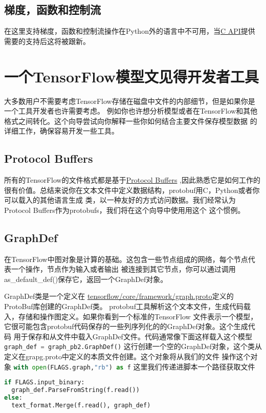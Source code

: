 \subsection{梯度，函数和控制流}
在这里支持梯度，函数和控制流操作在Python外的语言中不可用，当\href{https://www.github.com/tensorflow/tensorflow/blob/r1.4/tensorflow/c/c_api.h}{C API}提供需要的支持后这将被跟新。
\section{一个TensorFlow模型文见得开发者工具}
大多数用户不需要考虑TensorFlow存储在磁盘中文件的内部细节，但是如果你是一个工具开发者也许需要考虑。
例如你也许想分析模型或者在TensorFlow和其他格式之间转化。这个向导尝试向你解释一些你如何结合主要文件保存模型数据
的详细工作，确保容易开发一些工具。
\subsection{Protocol Buffers}
所有的TensorFlow的文件格式都是基于\href{https://developers.google.com/protocol-buffers/?hl=en}{Protocol Buffers}
,因此熟悉它是如何工作的很有价值。总结来说你在文本文件中定义数据结构，protobuf用C，Python或者你可以载入的其他语言生成
类，以一种友好的方式访问数据。我们经常认为Protocol Buffers作为protobufs，我们将在这个向导中使用用这个
这个惯例。
\subsection{GraphDef}
在TensorFlow中图对象是计算的基础。这包含一些节点组成的网络，每个节点代表一个操作，节点作为输入或者输出
被连接到其它节点，你可以通过调用as\_default\_def()保存它，返回一个GraphDef对象。

GraphDef类是一个定义在
\href{https://github.com/tensorflow/tensorflow/blob/master/tensorflow/core/framework/graph.proto}{tensorflow/core/framework/graph.proto}定义的ProtoBuf库创建的GraphDef类。
protobuf工具解析这个文本文件，生成代码载入，存储和操作图定义。如果你看到一个标准的TensorFlow
文件表示一个模型，它很可能包含protobuf代码保存的一些列序列化的的GraphDef对象。这个生成代码
用于保存和从文件中载入GraphDef文件。代码通常像下面这样载入这个模型
\lstinline[language=Python]{graph_def = graph_pb2.GraphDef()}
这行创建一个空的GraphDef对象，这个类从定义在grapg.proto中定义的本质文件创建。这个对象将从我们的文件
操作这个对象
\lstinline[language=Python]{with open(FLAGS.graph,"rb") as f}
这里我们传递进脚本一个路径获取文件
\begin{lstlisting}[language=Python]
if FLAGS.input_binary:
  graph_def.ParseFromString(f.read())
else:
  text_format.Merge(f.read(), graph_def)
\end{lstlisting}
